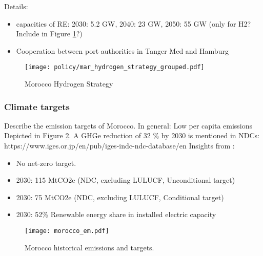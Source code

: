Details:
\begin{itemize}
    \item capacities of RE: 2030: 5.2 GW, 2040: 23 GW, 2050: 55 GW (only for H2? Include in Figure \ref{fig:mar_hydrogen_strategy}?)
    \item Cooperation between port authorities in Tanger Med and Hamburg
\end{itemize}

\begin{figure}
    \centering
    \texttt{[image: policy/mar\_hydrogen\_strategy\_grouped.pdf]}
    \caption{Morocco Hydrogen Strategy}
    \label{fig:mar_hydrogen_strategy}
\end{figure}

\subsubsection{Climate targets}
Describe the emission targets of Morocco. In general: Low per capita emissions
Depicted in Figure \ref{fig:morocco_em}.
A GHGe reduction of 32 \% by 2030 is mentioned in \cite[5]{Boulakhbar2020}
NDCs: https://www.iges.or.jp/en/pub/iges-indc-ndc-database/en 
Insights from \cite{CAT2021}:
\begin{itemize}
    \item No net-zero target.
    \item 2030: 115 MtCO2e (NDC, excluding LULUCF, Unconditional target)
    \item 2030: 75 MtCO2e (NDC, excluding LULUCF, Conditional target)
    \item 2030: 52\% Renewable energy share in installed electric capacity
\end{itemize}

\begin{figure}[h!]
    \centering
    \texttt{[image: morocco\_em.pdf]}
    \caption{Morocco historical emissions and targets.}
    \label{fig:morocco_em}
\end{figure}